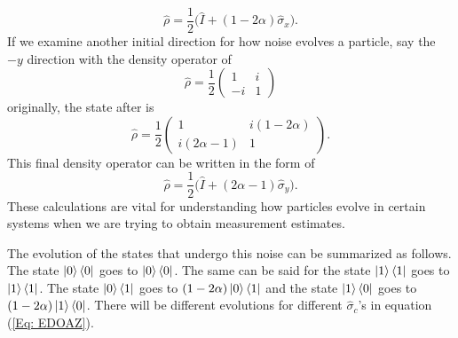\documentclass[twocolumn]{article}
\begin{document}
\begin{equation} \label{Eq: MONEDO+XE}
\hat{\rho}=\frac{1}{2}\big(\hat{I}+(1-2\alpha)\hat{\sigma}_x\big).
\end{equation}
If we examine another initial direction for how noise evolves a particle, say the $-y$ direction with the density operator of 
\begin{equation} \label{Eq: MONDO-Y}
\hat{\rho}=\frac{1}{2}
\begin{pmatrix}
1 & i \\
-i & 1
\end{pmatrix}
\end{equation}
originally, the state after is
\begin{equation} \label{Eq: MONEDO-Y}
\hat{\rho}=\frac{1}{2}
\begin{pmatrix}
1 & i(1-2\alpha) \\
i(2\alpha-1) & 1
\end{pmatrix}.
\end{equation}
This final density operator can be written in the form of 
\begin{equation} \label{Eq: MONEDO-YE}
\hat{\rho}=\frac{1}{2}\big(\hat{I}+(2\alpha-1)\hat{\sigma}_y\big).
\end{equation}
These calculations are vital for understanding how particles evolve in certain systems when we are trying to obtain measurement estimates. 

The evolution of the states that undergo this noise can be summarized as follows. The state $\ket{0}\bra{0}$ goes to $\ket{0}\bra{0}$. The same can be said for the state $\ket{1}\bra{1}$ goes to $\ket{1}\bra{1}$. The state $\ket{0}\bra{1}$ goes to $(1-2\alpha)\ket{0}\bra{1}$ and the state $\ket{1}\bra{0}$ goes to $(1-2\alpha)\ket{1}\bra{0}$. There will be different evolutions for different $\hat{\sigma}_c$'s in equation (\ref{Eq: EDOAZ}).
\end{document}
